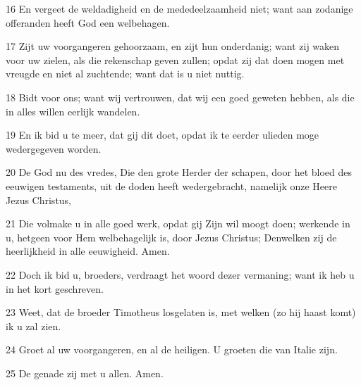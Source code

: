 \par 16 En vergeet de weldadigheid en de mededeelzaamheid niet; want aan zodanige offeranden heeft God een welbehagen.
\par 17 Zijt uw voorgangeren gehoorzaam, en zijt hun onderdanig; want zij waken voor uw zielen, als die rekenschap geven zullen; opdat zij dat doen mogen met vreugde en niet al zuchtende; want dat is u niet nuttig.
\par 18 Bidt voor ons; want wij vertrouwen, dat wij een goed geweten hebben, als die in alles willen eerlijk wandelen.
\par 19 En ik bid u te meer, dat gij dit doet, opdat ik te eerder ulieden moge wedergegeven worden.
\par 20 De God nu des vredes, Die den grote Herder der schapen, door het bloed des eeuwigen testaments, uit de doden heeft wedergebracht, namelijk onze Heere Jezus Christus,
\par 21 Die volmake u in alle goed werk, opdat gij Zijn wil moogt doen; werkende in u, hetgeen voor Hem welbehagelijk is, door Jezus Christus; Denwelken zij de heerlijkheid in alle eeuwigheid. Amen.
\par 22 Doch ik bid u, broeders, verdraagt het woord dezer vermaning; want ik heb u in het kort geschreven.
\par 23 Weet, dat de broeder Timotheus losgelaten is, met welken (zo hij haast komt) ik u zal zien.
\par 24 Groet al uw voorgangeren, en al de heiligen. U groeten die van Italie zijn.
\par 25 De genade zij met u allen. Amen.




